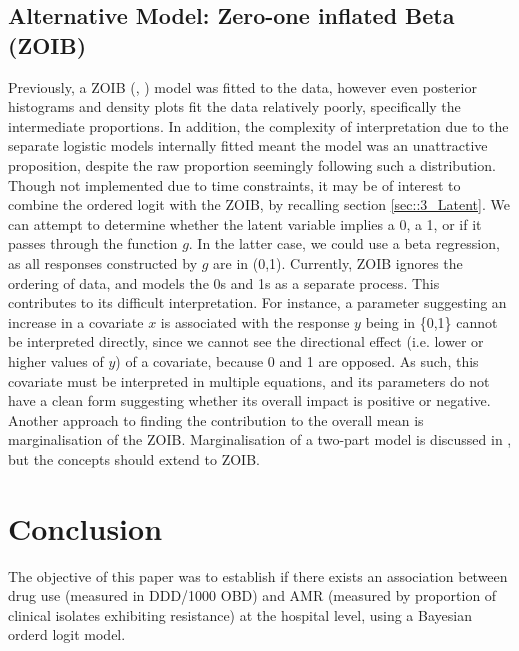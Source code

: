 \documentclass[11pt,twoside]{article}
\numberwithin{Theorem}{section}
\numberwithin{Definition}{section}
\numberwithin{Lemma}{section}
\numberwithin{Algorithm}{section}
\numberwithin{equation}{section}
\begin{document}
\subsection{Alternative Model: Zero-one inflated Beta (ZOIB)}

Previously, a ZOIB (\citeauthor{Ospina2008}, \citeyear{Ospina2008}) model was fitted to the data, however even posterior histograms and density plots fit the data relatively poorly, specifically the intermediate proportions. In addition, the complexity of interpretation due to the separate logistic models internally fitted meant the model was an unattractive proposition, despite the raw proportion seemingly following such a distribution. \\

Though not implemented due to time constraints, it may be of interest to combine the ordered logit with the ZOIB, by recalling section \ref{sec::3_Latent}. We can attempt to determine whether the latent variable implies a 0, a 1, or if it passes through the function $g$. In the latter case, we could use a beta regression, as all responses constructed by $g$ are in (0,1). Currently, ZOIB ignores the ordering of data, and models the 0s and 1s as a separate process. This contributes to its difficult interpretation. For instance, a parameter suggesting an increase in a covariate $x$ is associated with the response $y$ being in \{0,1\} cannot be interpreted directly, since we cannot see the directional effect (i.e. lower or higher values of $y$) of a covariate, because 0 and 1 are opposed. As such, this covariate must be interpreted in multiple equations, and its parameters do not have a clean form suggesting whether its overall impact is positive or negative. \\

Another approach to finding the contribution to the overall mean is marginalisation of the ZOIB. Marginalisation of a two-part model is discussed in \cite{SmithMarginalised}, but the concepts should extend to ZOIB. 

\newpage

\section{Conclusion} \label{sec::Conclusion}

The objective of this paper was to establish if there exists an association between drug use (measured in DDD/1000 OBD) and AMR (measured by proportion of clinical isolates exhibiting resistance) at the hospital level, using a Bayesian orderd logit model. \\
\end{document}
